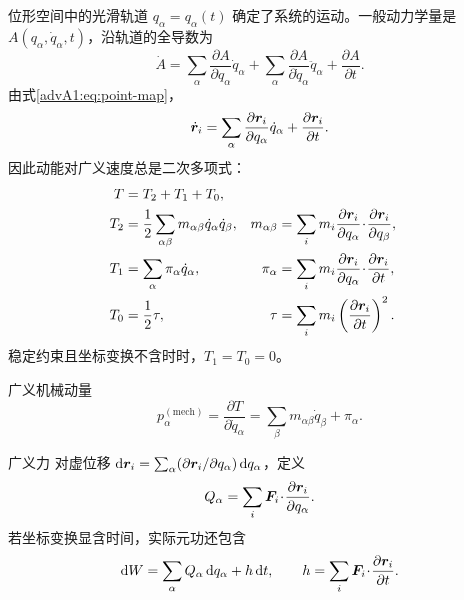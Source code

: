 位形空间中的光滑轨道 $q_\alpha=q_\alpha(t)$ 确定了系统的运动。一般动力学量是
$A(q_\alpha,\dot q_\alpha,t)$，沿轨道的全导数为
\begin{equation}\label{advA1:eq:total-derivative}
 \dot A=\sum_\alpha\frac{\partial A}{\partial q_\alpha}\dot q_\alpha
 +\sum_\alpha\frac{\partial A}{\partial\dot q_\alpha}\ddot q_\alpha
 +\frac{\partial A}{\partial t}.
\end{equation}
由式\eqref{advA1:eq:point-map}，
\[
 \dot{\vect r}_i=\sum_\alpha
 \frac{\partial\vect r_i}{\partial q_\alpha}\dot q_\alpha
 +\frac{\partial\vect r_i}{\partial t}.
\]
因此动能对广义速度总是二次多项式：
\begin{align}
 T&=T_2+T_1+T_0,\label{advA1:eq:T-decomp}\\
 T_2&=\frac12\sum_{\alpha\beta}m_{\alpha\beta}\dot q_\alpha\dot q_\beta,
 &m_{\alpha\beta}&=\sum_i m_i
 \frac{\partial\vect r_i}{\partial q_\alpha}\!\cdot\!
 \frac{\partial\vect r_i}{\partial q_\beta},\notag\\
 T_1&=\sum_\alpha\pi_\alpha\dot q_\alpha,
 &\pi_\alpha&=\sum_i m_i
 \frac{\partial\vect r_i}{\partial q_\alpha}\!\cdot\!
 \frac{\partial\vect r_i}{\partial t},\notag\\
 T_0&=\frac12\tau,
 &\tau&=\sum_i m_i\left(\frac{\partial\vect r_i}{\partial t}\right)^2.\notag
\end{align}
稳定约束且坐标变换不含时时，$T_1=T_0=0$。

\begin{advdefinition}{广义机械动量}\label{advA1:def:momentum}
\[
 p_\alpha^{(\mathrm{mech})}=\frac{\partial T}{\partial\dot q_\alpha}
 =\sum_\beta m_{\alpha\beta}\dot q_\beta+\pi_\alpha .
\]
\end{advdefinition}

\begin{advdefinition}{广义力}\label{advA1:def:force}
对虚位移 $\dd\vect r_i=\sum_\alpha
(\partial\vect r_i/\partial q_\alpha)\dd q_\alpha$，定义
\[
 Q_\alpha=\sum_i\vect F_i\!\cdot\!
 \frac{\partial\vect r_i}{\partial q_\alpha}.
\]
若坐标变换显含时间，实际元功还包含
\[
 \dd W=\sum_\alpha Q_\alpha\dd q_\alpha+h\dd t,
 \qquad h=\sum_i\vect F_i\!\cdot\!\frac{\partial\vect r_i}{\partial t}.
\]
\end{advdefinition}

